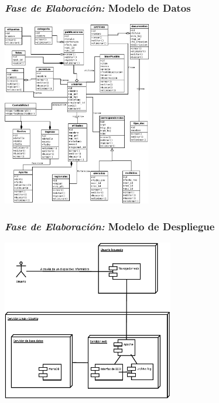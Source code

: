 \documentclass[xcolor=dvipsnames, xcolor=table]{beamer}
\begin{document}
\begin{frame}
    \frametitle{\textit{Fase de Elaboración:} Modelo de Datos}
    \centering\includegraphics[width=6.5cm]{clasesd}
\end{frame}

\begin{frame}
    \frametitle{\textit{Fase de Elaboración:} Modelo de Despliegue}
    \centering\includegraphics[width=7.5cm]{des}
\end{frame}
\end{document}
